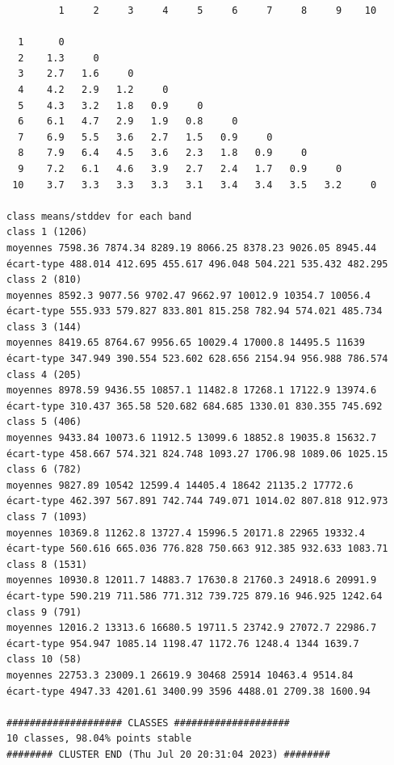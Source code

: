 \documentclass[environments,article,submit,pdftex,moreauthors]{Definitions/mdpi}
\begin{document}
\begin{scriptsize}
\begin{verbatim}
         1     2     3     4     5     6     7     8     9    10

  1      0
  2    1.3     0
  3    2.7   1.6     0
  4    4.2   2.9   1.2     0
  5    4.3   3.2   1.8   0.9     0
  6    6.1   4.7   2.9   1.9   0.8     0
  7    6.9   5.5   3.6   2.7   1.5   0.9     0
  8    7.9   6.4   4.5   3.6   2.3   1.8   0.9     0
  9    7.2   6.1   4.6   3.9   2.7   2.4   1.7   0.9     0
 10    3.7   3.3   3.3   3.3   3.1   3.4   3.4   3.5   3.2     0

class means/stddev for each band
class 1 (1206)
moyennes 7598.36 7874.34 8289.19 8066.25 8378.23 9026.05 8945.44
écart-type 488.014 412.695 455.617 496.048 504.221 535.432 482.295
class 2 (810)
moyennes 8592.3 9077.56 9702.47 9662.97 10012.9 10354.7 10056.4
écart-type 555.933 579.827 833.801 815.258 782.94 574.021 485.734
class 3 (144)
moyennes 8419.65 8764.67 9956.65 10029.4 17000.8 14495.5 11639
écart-type 347.949 390.554 523.602 628.656 2154.94 956.988 786.574
class 4 (205)
moyennes 8978.59 9436.55 10857.1 11482.8 17268.1 17122.9 13974.6
écart-type 310.437 365.58 520.682 684.685 1330.01 830.355 745.692
class 5 (406)
moyennes 9433.84 10073.6 11912.5 13099.6 18852.8 19035.8 15632.7
écart-type 458.667 574.321 824.748 1093.27 1706.98 1089.06 1025.15
class 6 (782)
moyennes 9827.89 10542 12599.4 14405.4 18642 21135.2 17772.6
écart-type 462.397 567.891 742.744 749.071 1014.02 807.818 912.973
class 7 (1093)
moyennes 10369.8 11262.8 13727.4 15996.5 20171.8 22965 19332.4
écart-type 560.616 665.036 776.828 750.663 912.385 932.633 1083.71
class 8 (1531)
moyennes 10930.8 12011.7 14883.7 17630.8 21760.3 24918.6 20991.9
écart-type 590.219 711.586 771.312 739.725 879.16 946.925 1242.64
class 9 (791)
moyennes 12016.2 13313.6 16680.5 19711.5 23742.9 27072.7 22986.7
écart-type 954.947 1085.14 1198.47 1172.76 1248.4 1344 1639.7
class 10 (58)
moyennes 22753.3 23009.1 26619.9 30468 25914 10463.4 9514.84
écart-type 4947.33 4201.61 3400.99 3596 4488.01 2709.38 1600.94

#################### CLASSES ####################
10 classes, 98.04% points stable
######## CLUSTER END (Thu Jul 20 20:31:04 2023) ########
\end{verbatim}
\end{scriptsize}
\end{document}
